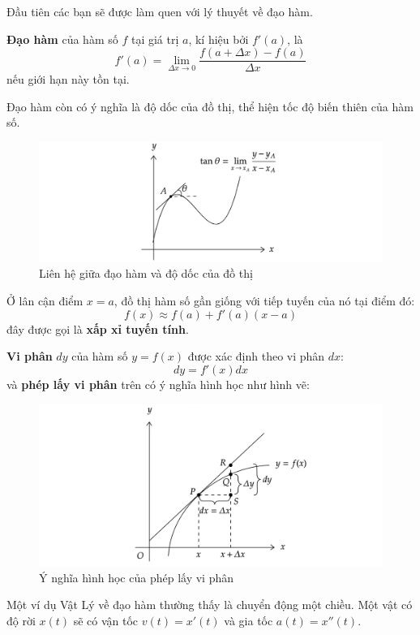 Đầu tiên các bạn sẽ được làm quen với lý thuyết về đạo hàm.

\textbf{Đạo hàm} của hàm số $f$ tại giá trị $a$, kí hiệu bởi $f'(a)$, là
    \begin{equation}
        f'(a)=\lim_{\Delta x\rightarrow 0}\frac{f(a+\Delta x)-f(a)}{\Delta x}
    \end{equation}
nếu giới hạn này tồn tại.

Đạo hàm còn có ý nghĩa là độ dốc của đồ thị, thể hiện tốc độ biến thiên của hàm số.

\begin{figure}[H]
\centering
\includegraphics[width=1\textwidth]{Tuan1/Figures/tocdobienthien.png}
\caption{Liên hệ giữa đạo hàm và độ dốc của đồ thị}
\end{figure}
Ở lân cận điểm $x=a$, đồ thị hàm số gần giống với tiếp tuyến của nó tại điểm đó:
\begin{equation}
        f(x)\approx f(a)+f'(a)(x-a)
    \end{equation}
đây được gọi là \textbf{xấp xỉ tuyến tính}.

\textbf{Vi phân} $dy$ của hàm số $y=f(x)$ được xác định theo vi phân $dx$:
\begin{equation}
    dy=f'(x)dx
\end{equation}
và \textbf{phép lấy vi phân} trên có ý nghĩa hình học như hình vẽ:

\begin{figure}[H]
\centering
\includegraphics[width=1\textwidth]{Tuan1/Figures/viphan.png}
\caption{Ý nghĩa hình học của phép lấy vi phân}
\end{figure}

Một ví dụ Vật Lý về đạo hàm thường thấy là chuyển động một chiều. Một vật có độ rời $x(t)$ sẽ có vận tốc $v(t)=x'(t)$ và gia tốc $a(t)=x''(t)$.